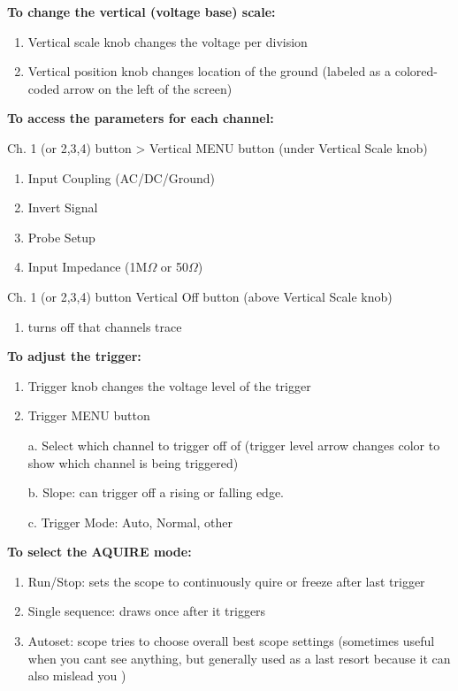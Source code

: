 \documentclass[
]{article}
\providecommand{\tightlist}{%
  \setlength{\itemsep}{0pt}\setlength{\parskip}{0pt}}
\begin{document}
\textbf{To change the vertical (voltage base) scale:}

\begin{enumerate}
\def\labelenumi{\arabic{enumi}.}
\item
  Vertical scale knob changes the voltage per division
\item
  Vertical position knob changes location of the ground (labeled as a
  colored-coded arrow on the left of the screen)
\end{enumerate}

\textbf{To access the parameters for each channel:}

Ch. 1 (or 2,3,4) button \textgreater{} Vertical MENU button (under
Vertical Scale knob)

\begin{enumerate}
\def\labelenumi{\arabic{enumi}.}
\item
  Input Coupling (AC/DC/Ground)
\item
  Invert Signal
\item
  Probe Setup
\item
  Input Impedance (1M\(\Omega\) or 50\(\Omega\))
\end{enumerate}

Ch. 1 (or 2,3,4) button Vertical Off button (above Vertical Scale knob)

\begin{enumerate}
\def\labelenumi{\arabic{enumi}.}
\tightlist
\item
  turns off that channels trace
\end{enumerate}

\textbf{To adjust the trigger:}

\begin{enumerate}
\def\labelenumi{\arabic{enumi}.}
\item
  Trigger knob changes the voltage level of the trigger
\item
  Trigger MENU button

  a. Select which channel to trigger off of (trigger level arrow changes
  color to show which channel is being triggered)

  b. Slope: can trigger off a rising or falling edge.

  c. Trigger Mode: Auto, Normal, other
\end{enumerate}

\textbf{To select the AQUIRE mode:}

\begin{enumerate}
\def\labelenumi{\arabic{enumi}.}
\item
  Run/Stop: sets the scope to continuously quire or freeze after last
  trigger
\item
  Single sequence: draws once after it triggers
\item
  Autoset: scope tries to choose overall best scope settings (sometimes
  useful when you cant see anything, but generally used as a last resort
  because it can also mislead you )
\end{enumerate}
\end{document}
